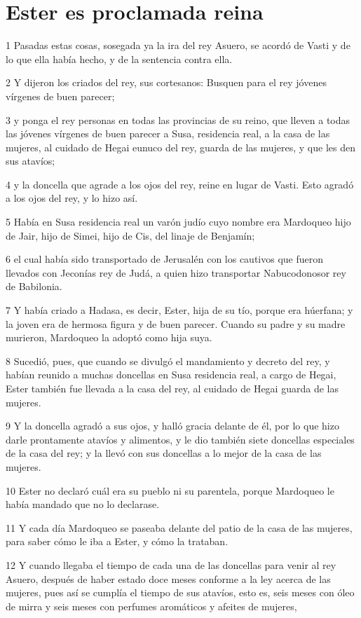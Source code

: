 \section*{Ester es proclamada reina}

\par 1 Pasadas estas cosas, sosegada ya la ira del rey Asuero, se acordó de Vasti y de lo que ella había hecho, y de la sentencia contra ella.
\par 2 Y dijeron los criados del rey, sus cortesanos: Busquen para el rey jóvenes vírgenes de buen parecer;
\par 3 y ponga el rey personas en todas las provincias de su reino, que lleven a todas las jóvenes vírgenes de buen parecer a Susa, residencia real, a la casa de las mujeres, al cuidado de Hegai eunuco del rey, guarda de las mujeres, y que les den sus atavíos;
\par 4 y la doncella que agrade a los ojos del rey, reine en lugar de Vasti. Esto agradó a los ojos del rey, y lo hizo así.
\par 5 Había en Susa residencia real un varón judío cuyo nombre era Mardoqueo hijo de Jair, hijo de Simei, hijo de Cis, del linaje de Benjamín;
\par 6 el cual había sido transportado de Jerusalén con los cautivos que fueron llevados con Jeconías rey de Judá, a quien hizo transportar Nabucodonosor rey de Babilonia. 
\par 7 Y había criado a Hadasa, es decir, Ester, hija de su tío, porque era húerfana; y la joven era de hermosa figura y de buen parecer. Cuando su padre y su madre murieron, Mardoqueo la adoptó como hija suya.
\par 8 Sucedió, pues, que cuando se divulgó el mandamiento y decreto del rey, y habían reunido a muchas doncellas en Susa residencia real, a cargo de Hegai, Ester también fue llevada a la casa del rey, al cuidado de Hegai guarda de las mujeres.
\par 9 Y la doncella agradó a sus ojos, y halló gracia delante de él, por lo que hizo darle prontamente atavíos y alimentos, y le dio también siete doncellas especiales de la casa del rey; y la llevó con sus doncellas a lo mejor de la casa de las mujeres. 
\par 10 Ester no declaró cuál era su pueblo ni su parentela, porque Mardoqueo le había mandado que no lo declarase.
\par 11 Y cada día Mardoqueo se paseaba delante del patio de la casa de las mujeres, para saber cómo le iba a Ester, y cómo la trataban.
\par 12 Y cuando llegaba el tiempo de cada una de las doncellas para venir al rey Asuero, después de haber estado doce meses conforme a la ley acerca de las mujeres, pues así se cumplía el tiempo de sus atavíos, esto es, seis meses con óleo de mirra y seis meses con perfumes aromáticos y afeites de mujeres,
